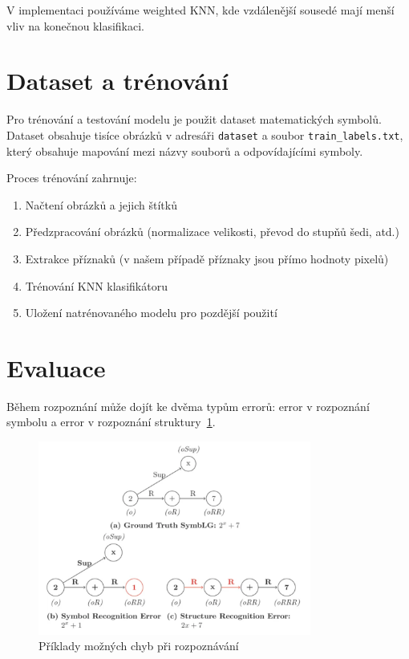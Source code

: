 \documentclass[12pt,a4paper]{article}
\begin{document}
V implementaci používáme weighted KNN, kde vzdálenější sousedé mají menší vliv na konečnou klasifikaci.

\section{Dataset a trénování}

Pro trénování a testování modelu je použit dataset matematických symbolů. Dataset obsahuje tisíce obrázků v adresáři \texttt{dataset} a soubor \texttt{train\_labels.txt}, který obsahuje mapování mezi názvy souborů a odpovídajícími symboly.

Proces trénování zahrnuje:
\begin{enumerate}
    \item Načtení obrázků a jejich štítků
    \item Předzpracování obrázků (normalizace velikosti, převod do stupňů šedi, atd.)
    \item Extrakce příznaků (v našem případě příznaky jsou přímo hodnoty pixelů)
    \item Trénování KNN klasifikátoru
    \item Uložení natrénovaného modelu pro pozdější použití
\end{enumerate}

\section{Evaluace}  %
Během rozpoznání může dojít ke dvěma typům errorů: error v rozpoznání symbolu a error v rozpoznání struktury~\ref{img:errors}.
\begin{figure}[h!]
    \centering
    \includegraphics[width=0.8\textwidth]{img/errors.png}
    \caption{Příklady možných chyb při rozpoznávání}
    \label{img:errors}
\end{figure}
 
\end{document}
